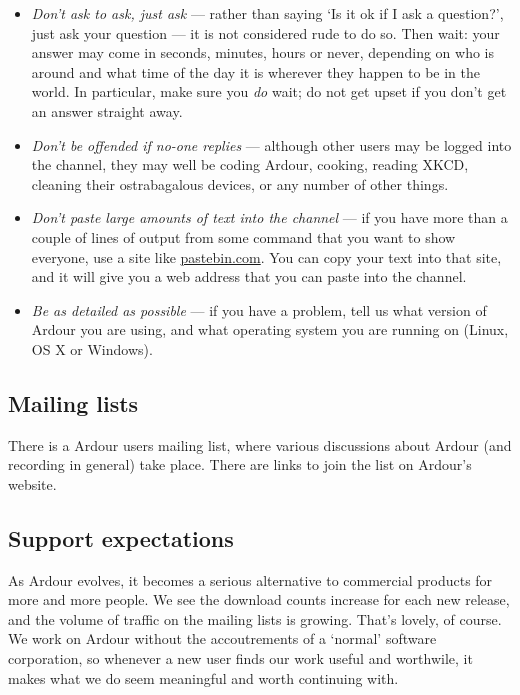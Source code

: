 \documentclass[10pt,a4paper]{book}
\begin{document}
\begin{itemize}
\item \emph{Don't ask to ask, just ask} --- rather than saying `Is it
  ok if I ask a question?', just ask your question --- it is not
  considered rude to do so.  Then wait: your answer may come in
  seconds, minutes, hours or never, depending on who is around and
  what time of the day it is wherever they happen to be in the world.
  In particular, make sure you \emph{do} wait; do not get upset if you
  don't get an answer straight away.
\item \emph{Don't be offended if no-one replies} --- although other
  users may be logged into the channel, they may well be coding
  Ardour, cooking, reading XKCD, cleaning their ostrabagalous devices,
  or any number of other things.
\item \emph{Don't paste large amounts of text into the channel} --- if
  you have more than a couple of lines of output from some command
  that you want to show everyone, use a site like \url{pastebin.com}.
  You can copy your text into that site, and it will give you a web
  address that you can paste into the channel.
\item \emph{Be as detailed as possible} --- if you have a problem,
  tell us what version of Ardour you are using, and what operating
  system you are running on (Linux, OS X or Windows).
\end{itemize}


\subsection{Mailing lists}

There is a Ardour users mailing list, where various discussions about
Ardour (and recording in general) take place.  There are links to join
the list on Ardour's website.


\subsection{Support expectations}

As Ardour evolves, it becomes a serious alternative to commercial
products for more and more people. We see the download counts increase
for each new release, and the volume of traffic on the mailing lists
is growing. That's lovely, of course. We work on Ardour without the
accoutrements of a `normal' software corporation, so whenever a new
user finds our work useful and worthwile, it makes what we do seem
meaningful and worth continuing with.
\end{document}
